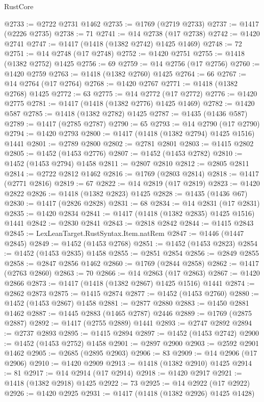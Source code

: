 \begin{lexlean}{RustCore}
\begin{coremodule}
@2733 := @2722 @2731 @1462
@2735 := @1769 (@2719 @2733)
@2737 := @1417 (@2226 @2735)
@2738 := 71
@2741 := @14 @2738 (@17 @2738)
@2742 := @1420 @2741
@2747 := @1417 (@1418 (@1382 @2742) @1425 @1469)
@2748 := 72
@2751 := @14 @2748 (@17 @2748)
@2752 := @1420 @2751
@2755 := @1418 (@1382 @2752) @1425
@2756 := 69
@2759 := @14 @2756 (@17 @2756)
@2760 := @1420 @2759
@2763 := @1418 (@1382 @2760) @1425
@2764 := 66
@2767 := @14 @2764 (@17 @2764)
@2768 := @1420 @2767
@2771 := @1418 (@1382 @2768) @1425
@2772 := 63
@2775 := @14 @2772 (@17 @2772)
@2776 := @1420 @2775
@2781 := @1417 (@1418 (@1382 @2776) @1425 @1469)
@2782 := @1420 @587
@2785 := @1418 (@1382 @2782) @1425
@2787 := @1435 (@1436 @587)
@2789 := @1417 (@2785 @2787)
@2790 := 65
@2793 := @14 @2790 (@17 @2790)
@2794 := @1420 @2793
@2800 := @1417 (@1418 (@1382 @2794) @1425 @1516) @1441
@2801 := @2789 @2800
@2802 := @2781 @2801
@2803 := @1415 @2802
@2805 := @1452 (@1453 @2776)
@2807 := @1452 (@1453 @2782)
@2810 := @1452 (@1453 @2794) @1458
@2811 := @2807 @2810
@2812 := @2805 @2811
@2814 := @2722 @2812 @1462
@2816 := @1769 (@2803 @2814)
@2818 := @1417 (@2771 @2816)
@2819 := 67
@2822 := @14 @2819 (@17 @2819)
@2823 := @1420 @2822
@2826 := @1418 (@1382 @2823) @1425
@2828 := @1435 (@1436 @67)
@2830 := @1417 (@2826 @2828)
@2831 := 68
@2834 := @14 @2831 (@17 @2831)
@2835 := @1420 @2834
@2841 := @1417 (@1418 (@1382 @2835) @1425 @1516) @1441
@2842 := @2830 @2841
@2843 := @2818 @2842
@2844 := @1415 @2843
@2845 := LexLeanTarget.RustSyntax.Item.natRem
@2847 := @1446 (@1447 @2845)
@2849 := @1452 (@1453 @2768)
@2851 := @1452 (@1453 @2823)
@2854 := @1452 (@1453 @2835) @1458
@2855 := @2851 @2854
@2856 := @2849 @2855
@2858 := @2847 @2856 @1462
@2860 := @1769 (@2844 @2858)
@2862 := @1417 (@2763 @2860)
@2863 := 70
@2866 := @14 @2863 (@17 @2863)
@2867 := @1420 @2866
@2873 := @1417 (@1418 (@1382 @2867) @1425 @1516) @1441
@2874 := @2862 @2873
@2875 := @1415 @2874
@2877 := @1452 (@1453 @2760)
@2880 := @1452 (@1453 @2867) @1458
@2881 := @2877 @2880
@2883 := @1450 @2881 @1462
@2887 := @1445 @2883 (@1465 @2787) @2446
@2889 := @1769 (@2875 @2887)
@2892 := @1417 (@2755 @2889) @1441
@2893 := @2747 @2892
@2894 := @2737 @2893
@2895 := @1415 @2894
@2897 := @1452 (@1453 @2742)
@2900 := @1452 (@1453 @2752) @1458
@2901 := @2897 @2900
@2903 := @2592 @2901 @1462
@2905 := @2685 (@2895 @2903)
@2906 := 83
@2909 := @14 @2906 (@17 @2906)
@2910 := @1420 @2909
@2913 := @1418 (@1382 @2910) @1425
@2914 := 81
@2917 := @14 @2914 (@17 @2914)
@2918 := @1420 @2917
@2921 := @1418 (@1382 @2918) @1425
@2922 := 73
@2925 := @14 @2922 (@17 @2922)
@2926 := @1420 @2925
@2931 := @1417 (@1418 (@1382 @2926) @1425 @1428)

\end{coremodule}
\end{lexlean}

